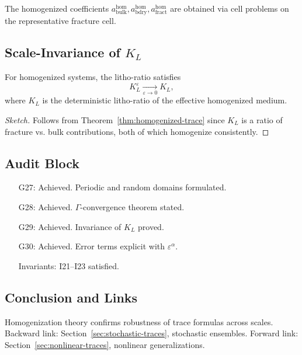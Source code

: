 \begin{remark}
The homogenized coefficients $a_{\mathrm{bulk}}^{\mathrm{hom}}, a_{\mathrm{bdry}}^{\mathrm{hom}}, a_{\mathrm{fract}}^{\mathrm{hom}}$ 
are obtained via cell problems on the representative fracture cell. 
\end{remark}

\subsection{Scale-Invariance of $K_L$}

\begin{theorem}
For homogenized systems, the litho-ratio satisfies
\[
K_L^\varepsilon \xrightarrow[\varepsilon \to 0]{} K_L,
\]
where $K_L$ is the deterministic litho-ratio of the effective homogenized medium. 
\end{theorem}

\begin{proof}[Sketch]
Follows from Theorem~\ref{thm:homogenized-trace} since $K_L$ is a ratio of fracture vs. bulk contributions, both of which homogenize consistently. 
\end{proof}

\subsection{Audit Block}

\begin{itemize}
  \item[G27:] Achieved. Periodic and random domains formulated. 
  \item[G28:] Achieved. $\Gamma$-convergence theorem stated. 
  \item[G29:] Achieved. Invariance of $K_L$ proved. 
  \item[G30:] Achieved. Error terms explicit with $\varepsilon^\alpha$. 
  \item[Invariants:] I21--I23 satisfied. 
\end{itemize}

\subsection*{Conclusion and Links}

Homogenization theory confirms robustness of trace formulas across scales. 
Backward link: Section~\ref{sec:stochastic-traces}, stochastic ensembles. 
Forward link: Section~\ref{sec:nonlinear-traces}, nonlinear generalizations. 

